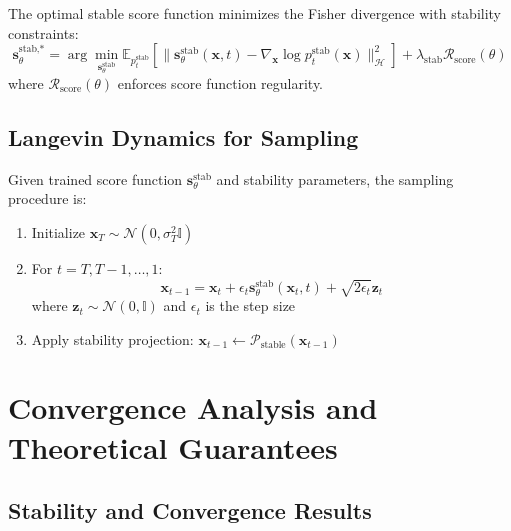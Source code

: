 \begin{theorem}
The optimal stable score function minimizes the Fisher divergence with stability constraints:
\begin{equation}
\mathbf{s}_\theta^{\text{stab,*} } = \arg\min_{\mathbf{s}_\theta^{\text{stab}}} \mathbb{E}_{p_t^{\text{stab}}} \left[\|\mathbf{s}_\theta^{\text{stab}}(\mathbf{x}, t) - \nabla_{\mathbf{x}} \log p_t^{\text{stab}}(\mathbf{x})\|_{\mathcal{H}}^2\right] + \lambda_{\text{stab}} \mathcal{R}_{\text{score}}(\theta)
\end{equation}
where $\mathcal{R}_{\text{score}}(\theta)$ enforces score function regularity.
\end{theorem}

\subsection{Langevin Dynamics for Sampling}

\begin{algorithm}
Given trained score function $\mathbf{s}_\theta^{\text{stab}}$ and stability parameters, the sampling procedure is:
\begin{enumerate}
\item Initialize $\mathbf{x}_T \sim \mathcal{N}(0, \sigma_T^2 \mathbb{I})$
\item For $t = T, T-1, \ldots, 1$:
   \begin{equation}
   \mathbf{x}_{t-1} = \mathbf{x}_t + \epsilon_t \mathbf{s}_\theta^{\text{stab}}(\mathbf{x}_t, t) + \sqrt{2\epsilon_t} \mathbf{z}_t
   \end{equation}
   where $\mathbf{z}_t \sim \mathcal{N}(0, \mathbb{I})$ and $\epsilon_t$ is the step size
\item Apply stability projection: $\mathbf{x}_{t-1} \leftarrow \mathcal{P}_{\text{stable}}(\mathbf{x}_{t-1})$
\end{enumerate}
\end{algorithm}

\section{Convergence Analysis and Theoretical Guarantees}

\subsection{Stability and Convergence Results}

